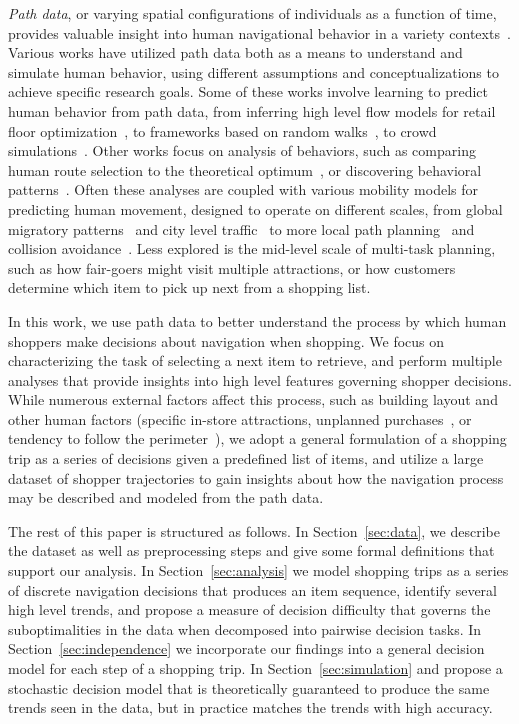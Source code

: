 \documentclass[aps,pre,twocolumn,groupedaddress]{revtex4-2}
\begin{document}
\textit{Path data}, or varying spatial configurations of individuals as a function of time, provides valuable insight into human navigational behavior in a variety contexts~\cite{hui2009path}. Various works have utilized path data both as a means to understand and simulate human behavior, using different assumptions and conceptualizations to achieve specific research goals. Some of these works involve learning to predict human behavior from path data, from inferring high level flow models for retail floor optimization~\cite{ying2019customer}, to frameworks based on random walks~\cite{gutierrez2016active}, to crowd simulations~\cite{karamouzas2014universal}. Other works focus on analysis of behaviors, such as comparing human route selection to the theoretical optimum~\cite{hui2009research}, or discovering behavioral patterns~\cite{larson2005exploratory,karamouzas2018crowd}. Often these analyses are coupled with various mobility models for predicting human movement, designed to operate on different scales, from global migratory patterns~\cite{riascos2012long} and city level traffic~\cite{camargo2019diagnosing,piovani2018measuring} to more local path planning~\cite{lima2016understanding,bailenson2000initial} and collision avoidance~\cite{karamouzas2014universal,van2011reciprocal,helbing1995social}. Less explored is the mid-level scale of multi-task planning, such as how fair-goers might visit multiple attractions, or how customers determine which item to pick up next from a shopping list.

In this work, we use path data to better understand the process by which human shoppers make decisions about navigation when shopping. We focus on characterizing the task of selecting a next item to retrieve, and perform multiple analyses that provide insights into high level features governing shopper decisions. While numerous external factors affect this process, such as building layout and other human factors (specific in-store attractions, unplanned purchases~\cite{massara2014impulse}, or tendency to follow the perimeter~\cite{farley1966stochastic}), we adopt a general formulation of a shopping trip as a series of decisions given a predefined list of items, and utilize a large dataset of  shopper trajectories to gain insights about how the navigation process may be described and modeled from the path data. 

The rest of this paper is structured as follows. In Section~\ref{sec:data}, we describe the dataset as well as preprocessing steps and give some formal definitions that support our analysis. In Section~\ref{sec:analysis} we model shopping trips as a series of discrete navigation decisions that produces an item sequence, identify several high level trends, and propose a measure of decision difficulty that governs the suboptimalities in the data when decomposed into pairwise decision tasks. In Section~\ref{sec:independence} we incorporate our findings into a general decision model for each step of a shopping trip. In Section~\ref{sec:simulation} and propose a stochastic decision model that is theoretically guaranteed to produce the same trends seen in the data, but in practice matches the trends with high accuracy.
\end{document}
